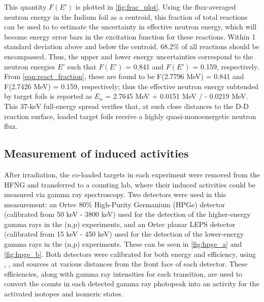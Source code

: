 \documentclass[5p]{elsarticle}
\newcommand{\pp}[1]{\left( #1\right)}
\begin{document}
This quantity $F\pp{E'}$ is plotted in \autoref{fig:frac_plot}. Using the flux-averaged neutron energy in the Indium foil as a centroid, this fraction of total reactions can be used to to estimate the uncertainty in effective neutron energy, which will become energy error bars in the excitation function for these reactions. Within 1 standard deviation above and below the centroid, 68.2\% of all reactions should be encompassed. Thus, the upper and lower energy uncertainties correspond to the neutron energies $E'$  such that $F\pp{E'}$ = 0.841 and $F\pp{E'}$ = 0.159, respectively. From \autoref{eqn:react_fraction},  these are found to be  F(2.7796 MeV) = 0.841 and F(2.7426 MeV) = 0.159, respectively; thus the effective neutron energy subtended by target foils is reported as $E_n$ = 2.7645 MeV + 0.0151 MeV / - 0.0219 MeV.  This 37-keV full-energy spread verifies that, at such close distances to the D-D reaction surface, loaded target foils receive a highly quasi-monoenergetic neutron flux.





\subsection{Measurement of induced activities}\label{sec:spectroscopy}

After irradiation, the co-loaded targets in each experiment were removed from the HFNG and transferred to a counting lab, where their induced activities could be measured via gamma ray spectroscopy. Two detectors were used in this measurement: an Ortec 80\% High-Purity Germanium (HPGe) detector (calibrated from 50 keV - 3800 keV) used for the detection of the higher-energy gamma rays in the (n,p) experiments, and an Ortec planar LEPS detector (calibrated from 15 keV - 450 keV) used for the detection of the lower-energy gamma rays in the (n,p) experiments. These can be seen in \autoref{fig:hpge_a} and \autoref{fig:hpge_b}. Both detectors were calibrated for both energy and efficiency, using , , and  sources at various distances from the front face of each detector. These efficiencies, along with gamma ray intensities for each transition, are used to convert the counts in each detected gamma ray photopeak into an activity for the activated isotopes and isomeric states. 
\end{document}
